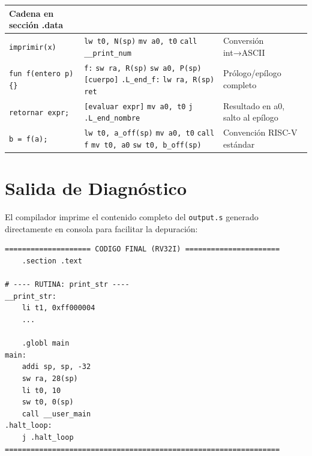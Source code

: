 \begin{longtable}{p{3cm}p{5cm}p{6cm}}
Cadena en sección .data \\
\midrule
\texttt{imprimir(x)} &
\texttt{lw t0, N(sp)} \newline \texttt{mv a0, t0} \newline \texttt{call \_\_print\_num} &
Conversión int→ASCII \\
\midrule
\texttt{fun f(entero p)\{\}} &
\texttt{f:} \newline \texttt{sw ra, R(sp)} \newline \texttt{sw a0, P(sp)} \newline \texttt{[cuerpo]} \newline \texttt{.L\_end\_f:} \newline \texttt{lw ra, R(sp)} \newline \texttt{ret} &
Prólogo/epílogo completo \\
\midrule
\texttt{retornar expr;} &
\texttt{[evaluar expr]} \newline \texttt{mv a0, t0} \newline \texttt{j .L\_end\_nombre} &
Resultado en a0, salto al epílogo \\
\midrule
\texttt{b = f(a);} &
\texttt{lw t0, a\_off(sp)} \newline \texttt{mv a0, t0} \newline \texttt{call f} \newline \texttt{mv t0, a0} \newline \texttt{sw t0, b\_off(sp)} &
Convención RISC-V estándar \\
\end{longtable}

\section{Salida de Diagnóstico}

El compilador imprime el contenido completo del \texttt{output.s} generado directamente en consola para facilitar la depuración:

\begin{verbatim}
==================== CODIGO FINAL (RV32I) ======================
    .section .text

# ---- RUTINA: print_str ----
__print_str:
    li t1, 0xff000004
    ...

    .globl main
main:
    addi sp, sp, -32
    sw ra, 28(sp)
    li t0, 10
    sw t0, 0(sp)
    call __user_main
.halt_loop:
    j .halt_loop
================================================================
\end{verbatim}
